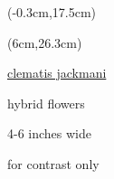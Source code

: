 \documentclass[a4paper,9pt]{article}
\begin{document}
\begin{textblock*}{4in}(-0.3cm,17.5cm)%
	\tiny
\end{textblock*}%

\begin{textblock*}{4in}(6cm,26.3cm)%
	\scriptsize
	\begin{minipage}{4in} 
		\ul{clematis jackmani}\par
		hybrid flowers\par
		4-6 inches wide\par
		for contrast only\par
	\end{minipage}%
\end{textblock*}%
\end{document}
